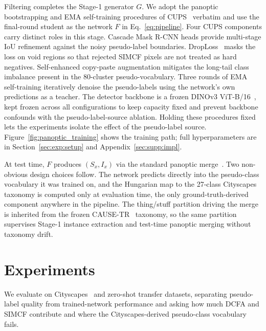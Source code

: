 \documentclass{article}
\begin{document}
Filtering completes the Stage-1 generator $G$. We adopt the panoptic bootstrapping and EMA self-training procedures of CUPS~\cite{hahn2025cups} verbatim and use the final-round student as the network $F$ in Eq.~\ref{eq:pipeline}. Four CUPS components carry distinct roles in this stage. Cascade Mask R-CNN heads provide multi-stage IoU refinement against the noisy pseudo-label boundaries. DropLoss~\cite{wang2023cutler} masks the loss on void regions so that rejected SIMCF pixels are not treated as hard negatives. Self-enhanced copy-paste augmentation mitigates the long-tail class imbalance present in the 80-cluster pseudo-vocabulary. Three rounds of EMA self-training iteratively denoise the pseudo-labels using the network's own predictions as a teacher. The detector backbone is a frozen DINOv3 ViT-B/16~\cite{simeoni2025dinov3}, kept frozen across all configurations to keep capacity fixed and prevent backbone confounds with the pseudo-label-source ablation. Holding these procedures fixed lets the experiments isolate the effect of the pseudo-label source. Figure~\ref{fig:panoptic_training} shows the training path; full hyperparameters are in Section~\ref{sec:exp:setup} and Appendix~\ref{sec:supp:impl}.

At test time, $F$ produces $(S_x, I_x)$ via the standard panoptic merge~\cite{kirillov2019panoptic}. Two non-obvious design choices follow. The network predicts directly into the pseudo-class vocabulary it was trained on, and the Hungarian map to the 27-class Cityscapes~\cite{cordts2016cityscapes} taxonomy is computed only at evaluation time, the only ground-truth-derived component anywhere in the pipeline. The thing/stuff partition driving the merge is inherited from the frozen CAUSE-TR~\cite{kim2024cause} taxonomy, so the same partition supervises Stage-1 instance extraction and test-time panoptic merging without taxonomy drift.

\FloatBarrier
\section{Experiments}
\label{sec:experiments}

We evaluate on Cityscapes~\cite{cordts2016cityscapes} and zero-shot transfer datasets, separating pseudo-label quality from trained-network performance and asking how much DCFA and SIMCF contribute and where the Cityscapes-derived pseudo-class vocabulary fails.
\end{document}
